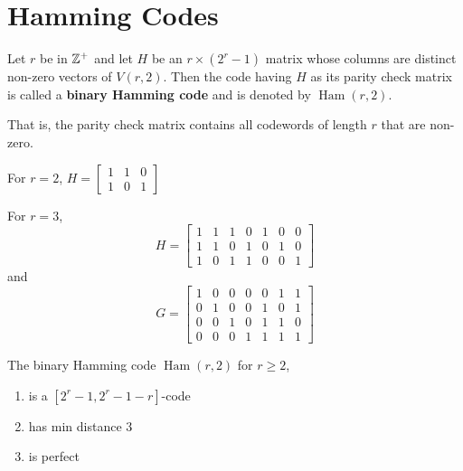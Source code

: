 \documentclass{article}
\DeclareMathOperator{\ham}{Ham}
\begin{document}
\section{Hamming Codes}
\begin{definition}
  Let \( r \) be in \( \mathbb{Z}^+ \) and let \( H \) be an \( r \times (2^r-1) \) matrix whose columns are distinct non-zero vectors of \( V(r, 2) \). Then the code having \( H \) as its parity check matrix is called a \textbf{binary Hamming code} and is denoted by \( \ham(r, 2) \).

  That is, the parity check matrix contains all codewords of length \( r \) that are non-zero.
\end{definition}
\begin{example}
  For \( r = 2 \), \( H = \begin{bmatrix}
    1 & 1 & 0 \\
    1 & 0 & 1
  \end{bmatrix} \)
\end{example}
\begin{example}
  For \( r = 3 \), \[
    H = \begin{bmatrix}
      1 & 1 & 1 & 0 & 1 & 0 & 0 \\
      1 & 1 & 0 & 1 & 0 & 1 & 0 \\
      1 & 0 & 1 & 1 & 0 & 0 & 1
    \end{bmatrix}
  \] and \[
    G = \begin{bmatrix}
      1 & 0 & 0 & 0 & 0 & 1 & 1 \\
      0 & 1 & 0 & 0 & 1 & 0 & 1 \\
      0 & 0 & 1 & 0 & 1 & 1 & 0 \\
      0 & 0 & 0 & 1 & 1 & 1 & 1
    \end{bmatrix}
  \]
\end{example}
\begin{theorem}
  The binary Hamming code \( \ham(r, 2) \) for \( r \ge 2 \), \begin{enumerate}
    \item is a \( [2^r-1, 2^r-1-r] \)-code 
    \item has min distance \( 3 \) 
    \item is perfect
  \end{enumerate}
\end{theorem}
\end{document}
